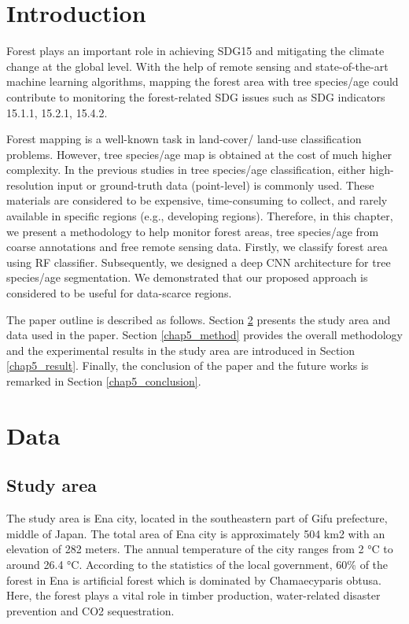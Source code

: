 \section{Introduction}
Forest plays an important role in achieving SDG15 and mitigating the climate change at the global level. With the help of remote sensing and state-of-the-art machine learning algorithms, mapping the forest area with tree species/age could contribute to monitoring the forest-related SDG issues such as SDG indicators 15.1.1, 15.2.1, 15.4.2. \par
Forest mapping is a well-known task in land-cover/ land-use classification problems. However, tree species/age map is obtained at the cost of much higher complexity. In the previous studies in tree species/age classification, either high-resolution input \citep{schiefer2020mapping,la2021multi} or ground-truth data (point-level) is commonly used. These materials are considered to be expensive, time-consuming to collect, and rarely available in specific regions (e.g., developing regions). Therefore, in this chapter, we present a methodology to help monitor forest areas, tree species/age from coarse annotations and free remote sensing data. Firstly, we classify forest area using RF classifier. Subsequently, we designed a deep CNN architecture for tree species/age segmentation. We demonstrated that our proposed approach is considered to be useful for data-scarce regions. \par
The paper outline is described as follows. Section \ref{chap5_data} presents the study area and data used in the paper. Section \ref{chap5_method} provides the overall methodology and the experimental results in the study area are introduced in Section \ref{chap5_result}. Finally, the conclusion of the paper and the future works is remarked in Section \ref{chap5_conclusion}. \par

\section{Data} \label{chap5_data}
\subsection{Study area}
The study area is Ena city, located in the southeastern part of Gifu prefecture, middle of Japan. The total area of Ena city is approximately 504 km2 with an elevation of 282 meters. The annual temperature of the city ranges from 2 °C to around 26.4 °C. According to the statistics of the local government, 60\% of the forest in Ena is artificial forest which is dominated by Chamaecyparis obtusa. Here, the forest plays a vital role in timber production, water-related disaster prevention and CO2 sequestration. \par

